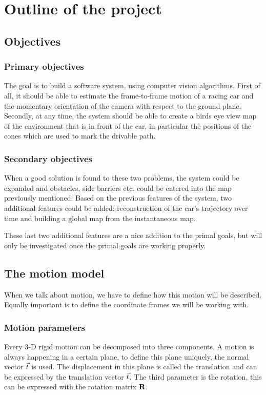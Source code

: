 \chapter{Outline of the project}
\label{chap:outline}

\section{Objectives}
\subsection{Primary objectives}
The goal is to build a software system, using computer vision algorithms. First of all, it should be able to estimate the frame-to-frame motion of a racing car and the momentary orientation of the camera with respect to the ground plane. Secondly, at any time, the system should be able to create a birds eye view map of the environment that is in front of the car, in particular the positions of the cones which are used to mark the drivable path.\bigskip 

\subsection{Secondary objectives}
When a good solution is found to these two problems, the system could be expanded and obstacles, side barriers etc. could be entered into the map previously mentioned. Based on the previous features of the system, two additional features could be added: reconstruction of the car's trajectory over time and building a global map from the instantaneous map.\bigskip

These last two additional features are a nice addition to the primal goals, but will only be investigated once the primal goals are working properly.\bigskip

\section{The motion model}
When we talk about motion, we have to define how this motion will be described. Equally important is to define the coordinate frames we will be working with.

\subsection{Motion parameters}
Every 3-D rigid motion can be decomposed into three components. A motion is always happening in a certain plane, to define this plane uniquely, the normal vector $\vec t$ is used. The displacement in this plane is called the translation and can be expressed by the translation vector $\vec t$. The third parameter is the rotation, this can be expressed with the rotation matrix $\mathbf{R}$.\bigskip

